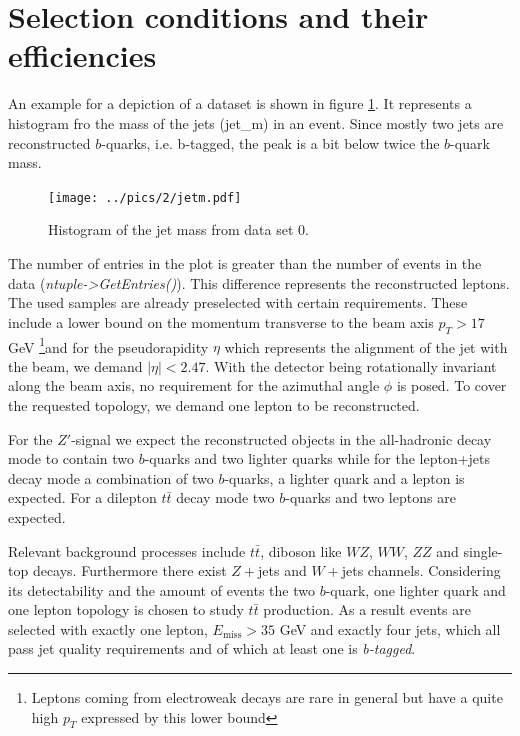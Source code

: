 \FloatBarrier
\section{Selection conditions and their efficiencies}
\label{sec:selection}
An example for a depiction of a dataset is shown in figure \ref{pic:examplePlot}. It represents a histogram fro the mass of the jets (jet\_m) in an
event. Since mostly two jets are reconstructed $b$-quarks, i.e. b-tagged, the peak is a bit below twice the $b$-quark mass. 
\begin{figure}[t]
 \texttt{[image: ../pics/2/jetm.pdf]}
 \caption{Histogram of the jet mass from data set 0.}
 \label{pic:examplePlot}
\end{figure}
The number of entries in the plot is greater than the number of events in the data (\emph{ntuple->GetEntries()}). This difference represents the reconstructed leptons.
The used samples are already preselected with certain requirements. These include a lower bound on the momentum transverse to the beam axis $p_T>17$ GeV 
\footnote[1]{Leptons coming from electroweak
decays are rare in general but have a quite high $p_T$ expressed by this lower bound}and
for the pseudorapidity $\eta$ which represents the alignment of the jet with the beam, we demand $|\eta| < 2.47$. With the detector being rotationally
invariant along the beam axis, no requirement for the azimuthal angle $\phi$ is posed. To cover the requested topology, we demand one lepton to be reconstructed. 

For the $Z'$-signal we expect the reconstructed objects in the all-hadronic decay mode to contain two $b$-quarks and two lighter quarks while for the lepton+jets decay mode a combination of two $b$-quarks, a lighter quark and a lepton is expected. For a dilepton $t\bar{t}$ decay mode two $b$-quarks and two leptons are expected.

Relevant background processes include $t\bar{t}$, diboson like $WZ$, $WW$, $ZZ$ and single-top decays. Furthermore there exist $Z+$jets and $W+$jets channels. Considering its detectability and the amount of events the two $b$-quark, one lighter quark and one lepton topology is chosen to study $t\bar{t}$ production. As a result events are selected with exactly one lepton, $E_\text{miss} > 35$ GeV and exactly four jets, which all pass jet quality requirements and of which at least one is \emph{b-tagged}.

